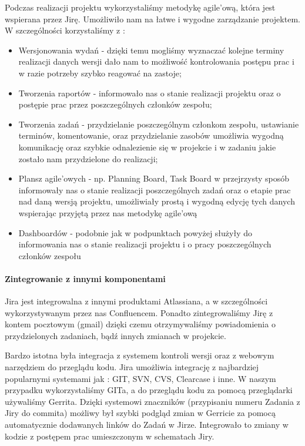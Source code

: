\documentclass[licencjacka]{pracamgr}
\begin{document}
Podczas realizacji projektu wykorzystaliśmy metodykę agile'ową, która jest wspierana przez Jirę. 
Umożliwiło nam na łatwe i wygodne zarządzanie projektem. W szczególności korzystaliśmy z :
\begin{itemize}
\item Wersjonowania wydań - dzięki temu mogliśmy wyznaczać kolejne terminy realizacji danych wersji 
  dało nam to możliwość kontrolowania postępu prac i w razie potrzeby szybko reagować na zastoje;
\item Tworzenia raportów - informowało nas o stanie realizacji projektu oraz o postępie prac przez poszczególnych członków zespołu;
\item Tworzenia zadań - przydzielanie poszczególnym członkom zespołu, ustawianie terminów, komentowanie, oraz przydzielanie zasobów 
umożliwia wygodną komunikację oraz szybkie odnalezienie się w projekcie i w zadaniu jakie zostało nam przydzielone do realizacji;
\item Plansz agile'owych - np. Planning Board, Task Board w przejrzysty sposób informowały nas o stanie realizacji poszczególnych zadań oraz o 
etapie prac nad daną wersją projektu, umożliwiały prostą i wygodną edycję tych danych wspierając przyjętą przez nas metodykę agile'ową
\item Dashboardów - podobnie jak w podpunktach powyżej służyły do informowania nas o stanie realizacji projektu i o pracy poszczególnych członków zespołu
\end{itemize}

\paragraph{Zintegrowanie z innymi komponentami}
Jira jest integrowalna z innymi produktami Atlassiana, a w szczególności wykorzystywanym przez nas Confluencem.
Ponadto zintegrowaliśmy Jirę z kontem pocztowym (gmail) dzięki czemu otrzymywaliśmy powiadomienia o przydzielonych zadaniach, bądź innych zmianach w projekcie.


Bardzo istotna była integracja z systemem kontroli wersji oraz z webowym narzędziem do przeglądu kodu.
Jira umożliwia integrację z najbardziej popularnymi systemami jak : GIT, SVN, CVS, Clearcase i inne.
W naszym przypadku wykorzystaliśmy GITa, a do przeglądu kodu za pomocą przeglądarki używaliśmy Gerrita. 
Dzięki systemowi znaczników (przypisaniu numeru Zadania z Jiry do commita) możliwy był szybki podgląd zmian w Gerricie za pomocą automatycznie dodawanych linków do Zadań w Jirze.
Integrowało to zmiany w kodzie z postępem prac umieszczonym w schematach Jiry.  
\end{document}
